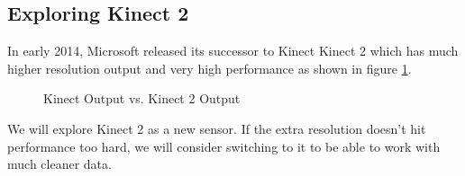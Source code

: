 \subsection{Exploring Kinect 2}
In early 2014, Microsoft released its successor to Kinect Kinect 2 which has much higher resolution output and very high performance as shown in figure \ref{fig:KK2}.
\begin{figure}
    \centering
    \qquad
    \caption{Kinect Output vs. Kinect 2 Output}
    \label{fig:KK2}
\end{figure}

We will explore Kinect 2 as a new sensor. If the extra resolution doesn't hit performance too hard, we will consider switching to it to be able to work with much cleaner data. 